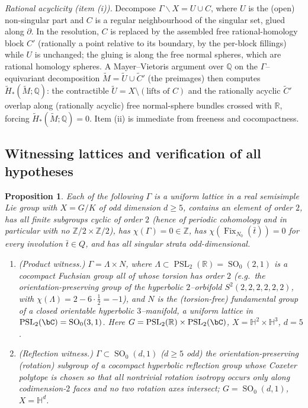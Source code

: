 \documentclass[12pt]{article}
\newcommand{\bR}{\mathbb{R}}
\newcommand{\bQ}{\mathbb{Q}}
\newcommand{\bZ}{\mathbb{Z}}
\newcommand{\bH}{\mathbb{H}}
\newcommand{\Fix}{\operatorname{Fix}}
\DeclareMathOperator{\SO}{SO}
\DeclareMathOperator{\PSL}{PSL}
\newtheorem{proposition}{Proposition}
\theoremstyle{definition}
\begin{document}
\medskip
\noindent\emph{Rational acyclicity \textup{(}item (i)\textup{)}.}  Decompose
$\Gamma\backslash X = U\cup C$, where $U$ is the (open) non-singular part and $C$
is a regular neighbourhood of the singular set, glued along $\partial$.  In the
resolution, $C$ is replaced by the assembled free rational-homology block $C'$
(rationally a point relative to its boundary, by the per-block fillings) while $U$
is unchanged; the gluing is along the free normal spheres, which are rational
homology spheres.  A Mayer--Vietoris argument over $\bQ$ on the
$\Gamma$--equivariant decomposition $\widetilde M=\widetilde U\cup\widetilde C'$
(the preimages) then computes $\widetilde H_*(\widetilde M;\bQ)$: the contractible
$\widetilde U=X\setminus(\text{lifts of }C)$ and the rationally acyclic
$\widetilde C'$ overlap along (rationally acyclic) free normal-sphere bundles
crossed with $\bR$, forcing $\widetilde H_*(\widetilde M;\bQ)=0$.  Item (ii) is
immediate from freeness and cocompactness.

\subsection{Witnessing lattices and verification of all hypotheses}

\begin{proposition}\label{prop:witness}
Each of the following $\Gamma$ is a uniform lattice in a real semisimple Lie group
with $X=G/K$ of odd dimension $d\ge5$, contains an element of order $2$, has all
finite subgroups cyclic of order $2$ \textup{(}hence of periodic cohomology and
in particular with no $\bZ/2\times\bZ/2$\textup{)}, has $\chi(\Gamma)=0\in\bZ$,
has $\chi(\Fix_{N_0}(\bar t))=0$ for every involution $\bar t\in Q$, and has all
singular strata odd-dimensional.
\begin{enumerate}
\item[\textup{(A)}] \emph{(Product witness.)} $\Gamma=\Lambda\times N$, where
$\Lambda\subset\PSL_2(\bR)=\SO_0(2,1)$ is a cocompact Fuchsian group all of whose
torsion has order $2$ (e.g.\ the orientation-preserving group of the hyperbolic
$2$--orbifold $S^2(2,2,2,2,2,2)$, with $\chi(\Lambda)=2-6\cdot\tfrac12=-1$), and
$N$ is the (torsion-free) fundamental group of a closed orientable hyperbolic
$3$--manifold, a uniform lattice in $\PSL_2(\bC)=\SO_0(3,1)$.  Here
$G=\PSL_2(\bR)\times\PSL_2(\bC)$, $X=\bH^2\times\bH^3$, $d=5$.
\item[\textup{(B)}] \emph{(Reflection witness.)} $\Gamma\subset\SO_0(d,1)$
($d\ge5$ odd) the orientation-preserving (rotation) subgroup of a cocompact
hyperbolic reflection group whose Coxeter polytope is chosen so that all
nontrivial rotation isotropy occurs only along codimension-$2$ faces and no two
rotation axes intersect; $G=\SO_0(d,1)$, $X=\bH^d$.
\end{enumerate}
\end{proposition}
\end{document}
